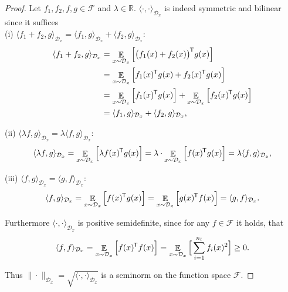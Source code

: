 \documentclass[11pt, a4paper]{article}
\newcommand{\R}{\mathbb{R}}
\newcommand{\D}{\mathcal{D}}
\newcommand{\F}{\mathcal{F}}
\newcommand*{\tr}{^{\mkern-1.5mu\mathsf{T}}}
\DeclareMathOperator*{\E}{\mathbb{E}}
\begin{document}
\begin{proof}
Let $f_1, f_2, f, g \in \F$ and $\lambda \in \R$. $\langle \cdot,\cdot \rangle_{\D_x}$ is indeed symmetric and bilinear since it suffices \\

(i) $\langle f_1 + f_2 , g \rangle_{\D_x} = \langle f_1 , g \rangle_{\D_x} + \langle f_2 , g \rangle_{\D_x}$:
\[ \begin{split}
\langle f_1 + f_2 , g \rangle_{\D_x}
&= \E_{x \sim \D_x} \Big [ \big ( f_1(x) + f_2(x) \big )\tr g(x) \Big ] \\\
&= \E_{x \sim \D_x} \Big [ f_1(x)\tr g(x) + f_2(x)\tr g(x) \Big ] \\\
&= \E_{x \sim \D_x} \Big [ f_1(x)\tr g(x) \Big ] + \E_{x \sim \D_x} \Big [ f_2(x)\tr g(x) \Big ] \\\
&= \langle f_1 , g \rangle_{\D_x} + \langle f_2 , g \rangle_{\D_x},
\end{split} \]

(ii) $\langle \lambda f , g \rangle_{\D_x} = \lambda \langle f, g \rangle_{\D_x}$:
\[ \langle \lambda f , g \rangle_{\D_x} = \E_{x \sim \D_x} \Big [ \lambda f(x)\tr g(x) \Big ] = \lambda \cdot \E_{x \sim \D_x} \Big [ f(x)\tr g(x) \Big ] = \lambda \langle f, g \rangle_{\D_x}, \]

(iii) $\langle f , g \rangle_{\D_x} = \langle g , f \rangle_{\D_x}$:
\[ \langle f , g \rangle_{\D_x} = \E_{x \sim \D_x} \Big [ f(x)\tr g(x) \Big ] = \E_{x \sim \D_x} \Big [ g(x)\tr f(x) \Big ] = \langle g , f \rangle_{\D_x}. \]

Furthermore $\langle \cdot,\cdot \rangle_{\D_x}$ is positive semidefinite, since for any $f \in \F$ it holds, that
\[ \langle f , f \rangle_{\D_x} =  \E_{x \sim \D_x} \Big [ f(x)\tr f(x) \Big ] = \E_{x \sim \D_x} \Big [ \sum_{i=1}^{n_l} f_i(x)^2 \Big ] \geq 0. \]

Thus $\| \cdot \|_{\D_x} = \sqrt{\langle \cdot , \cdot \rangle_{\D_x}}$ is a seminorm on the function space $\F$.
\end{proof}
\end{document}
